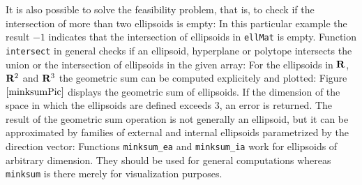 It is also possible to solve the feasibility problem, that is, to check
if the intersection of more than two ellipsoids is empty:
In this particular example the result $-1$ indicates that the intersection
of ellipsoids in {\tt ellMat} is empty.
Function {\tt intersect} in general checks if an ellipsoid,
hyperplane or polytope intersects the union or the intersection
of ellipsoids in the given array:
For the ellipsoids in ${\bf R}$, ${\bf R}^2$ and ${\bf R}^3$ the geometric
sum can be computed explicitely and plotted:
Figure $\ref{minksumPic}$ displays the geometric sum of ellipsoids.
\newline
If the dimension of the space in which the ellipsoids are defined exceeds $3$,
an error is returned. The result of the geometric sum operation is
not generally an ellipsoid, but it can be approximated by families
of external and internal ellipsoids parametrized by the direction vector:
Functions {\tt minksum\_ea} and {\tt minksum\_ia} work for ellipsoids of
arbitrary dimension. They should be used for general computations
whereas {\tt minksum} is there merely for visualization purposes.

